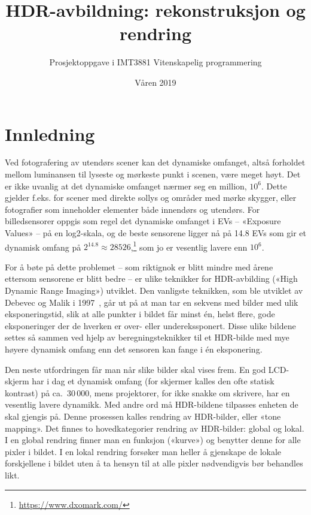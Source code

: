 \documentclass[11pt,a4paper]{article}
\begin{document}
\title{HDR-avbildning: rekonstruksjon og rendring}
\author{Prosjektoppgave  i IMT3881 Vitenskapelig programmering}
\date{Våren 2019}

\maketitle

\section{Innledning}

Ved fotografering av utendørs scener kan det dynamiske omfanget, altså forholdet mellom luminansen til lyseste og mørkeste punkt i scenen, være meget høyt. Det er ikke uvanlig at det dynamiske omfanget nærmer seg en million, $10^6$. Dette gjelder f.eks. for scener med direkte sollys og områder med mørke skygger, eller fotografier som inneholder elementer både innendørs og utendørs. For billedsensorer oppgis som regel det dynamiske omfanget i EVs – «Exposure Values» – på en log2-skala, og de beste sensorene ligger nå på 14.8 EVs som gir et dynamisk omfang på $2^{14.8} \approx 28526$,\footnote{\url{https://www.dxomark.com/}} som jo er vesentlig lavere enn $10^6$.

For å bøte på dette problemet – som riktignok er blitt mindre med årene ettersom sensorene er blitt bedre – er ulike teknikker for HDR-avbilding («High Dynamic Range Imaging») utviklet. Den vanligste teknikken, som ble utviklet av Debevec og Malik i 1997~\cite{Debevec:97}, går ut på at man tar en sekvens med bilder med ulik eksponeringstid, slik at alle punkter i bildet får minst én, helst flere, gode eksponeringer der de hverken er over- eller underekssponert. Disse ulike bildene settes så sammen ved hjelp av beregningsteknikker til et HDR-bilde med mye høyere dynamisk omfang enn det sensoren kan fange i én eksponering.

Den neste utfordringen får man når slike bilder skal vises frem. En god LCD-skjerm har i dag et dynamisk omfang (for skjermer kalles den ofte statisk kontrast) på ca.~30\,000, mens projektorer, for ikke snakke om skrivere, har en vesentlig lavere dynamikk. Med andre ord må HDR-bildene tilpasses enheten de skal gjengis på. Denne prosessen kalles rendring av HDR-bilder, eller «tone mapping». Det finnes to hovedkategorier rendring av HDR-bilder: global og lokal. I en global rendring finner man en funksjon («kurve») og benytter denne for alle pixler i bildet. I en lokal rendring forsøker man heller å gjenskape de lokale forskjellene i bildet uten å ta hensyn til at alle pixler nødvendigvis bør behandles likt.
\end{document}
